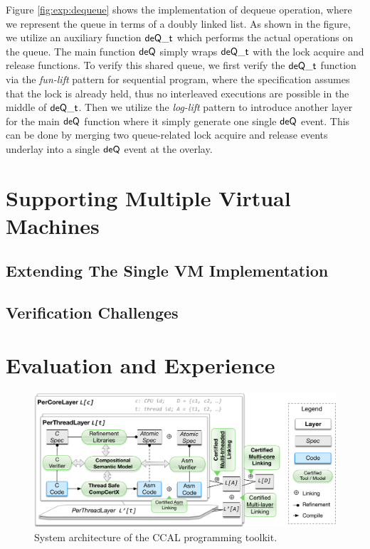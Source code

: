 Figure \ref{fig:exp:dequeue} shows the implementation of dequeue operation, where
we represent the queue in terms of a doubly linked list. 
As shown in the figure, we utilize an auxiliary function $\mathsf{deQ}\mathsf{\textcolor{black}{\_t}}$ which
performs the actual operations on the queue. The main function $\mathsf{deQ}$ simply
wraps $\mathsf{deQ}\mathsf{\textcolor{black}{\_t}}$ with the lock acquire and release functions.
To verify this shared queue, we first verify the $\mathsf{deQ}\mathsf{\textcolor{black}{\_t}}$ function
via the  \emph{fun-lift} pattern for sequential program, where the specification
assumes that the lock is already held, thus no interleaved executions are possible
in the middle of $\mathsf{deQ}\mathsf{\textcolor{black}{\_t}}$. Then we utilize 
the \emph{log-lift} pattern to introduce another layer for the main $\mathsf{deQ}$ function
where it simply generate one single $\mathsf{deQ}$ event. This can be done by merging two
queue-related lock acquire and release events underlay into a single $\mathsf{deQ}$ event
at the overlay. 


\section{Supporting Multiple Virtual Machines}

\subsection{Extending The Single VM Implementation}

\subsection{Verification Challenges}

\section{Evaluation and Experience}
\label{sec:kernel}

\begin{figure}[t]
\centering
\includegraphics[scale=.45]{figs/tool_chain}
\caption{System architecture of the CCAL programming toolkit.}
\label{fig:toolchain}
\end{figure}

